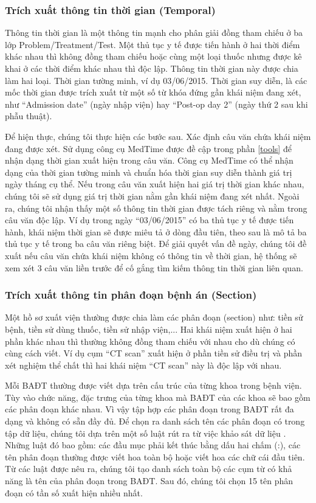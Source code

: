 \subsubsection*{Trích xuất thông tin thời gian (Temporal)}
Thông tin thời gian là một thông tin mạnh cho phân giải đồng tham chiếu ở ba lớp Problem/Treatment/Test. Một thủ tục y tế được tiến hành ở hai thời điểm khác nhau thì không đồng tham chiếu hoặc cùng một loại thuốc nhưng được kê khai ở các thời điểm khác nhau thì độc lập. Thông tin thời gian này được chia làm hai loại. Thời gian tường minh, ví dụ 03/06/2015. Thời gian suy diễn, là các mốc thời gian được trích xuất từ một số từ khóa đứng gần khái niệm đang xét, như ``Admission date'' (ngày nhập viện) hay ``Post-op day 2'' (ngày thứ 2 sau khi phẫu thuật).

Để hiện thực, chúng tôi thực hiện các bước sau. Xác định câu văn chứa khái niệm đang được xét. Sử dụng công cụ MedTime được đề cập trong phần \ref{tools} để nhận dạng thời gian xuất hiện trong câu văn. Công cụ MedTime có thể nhận dạng của thời gian tường minh và chuẩn hóa thời gian suy diễn thành giá trị ngày tháng cụ thể. Nếu trong câu văn xuất hiện hai giá trị thời gian khác nhau, chúng tôi sẽ sử dụng giá trị thời gian nằm gần khái niệm đang xét nhất. Ngoài ra, chúng tôi nhận thấy một số thông tin thời gian được tách riêng và nằm trong câu văn độc lập. Ví dụ trong ngày ``03/06/2015'' có ba thủ tục y tế được tiến hành, khái niệm thời gian sẽ được miêu tả ở dòng đầu tiên, theo sau là mô tả ba thủ tục y tế trong ba câu văn riêng biệt. Để giải quyết vấn đề ngày, chúng tôi đề xuất nếu câu văn chứa khái niệm không có thông tin về thời gian, hệ thống sẽ xem xét 3 câu văn liền trước để cố gắng tìm kiếm thông tin thời gian liên quan.

\subsubsection*{Trích xuất thông tin phân đoạn bệnh án (Section)}
Một hồ sơ xuất viện thường được chia làm các phân đoạn (section) như: tiền sử bệnh, tiền sử dùng thuốc, tiền sử nhập viện,... Hai khái niệm xuất hiện ở hai phần khác nhau thì thường không đồng tham chiếu với nhau cho dù chúng có cùng cách viết. Ví dụ cụm “CT scan” xuất hiện ở phần tiền sử điều trị và phần xét nghiệm thể chất thì hai khái niệm “CT scan” này là độc lập với nhau.

Mỗi BAĐT thường được viết dựa trên cấu trúc của từng khoa trong bệnh viện. Tùy vào chức năng, đặc trưng của từng khoa mà BAĐT của các khoa sẽ bao gồm các phân đoạn khác nhau. Vì vậy tập hợp các phân đoạn trong BAĐT rất đa dạng và không có sẵn đầy đủ. Để chọn ra danh sách tên các phân đoạn có trong tập dữ liệu, chúng tôi dựa trên một số luật rút ra từ việc khảo sát dữ liệu \cite{RandolphMiller2008}. Những luật đó bao gồm: các đầu mục phải kết thúc bằng dấu hai chấm (:), các tên phân đoạn thường được viết hoa toàn bộ hoặc viết hoa các chữ cái đầu tiên. Từ các luật được nêu ra, chúng tôi tạo danh sách toàn bộ các cụm từ có khả năng là tên của phân đoạn trong BAĐT. Sau đó, chúng tôi chọn 15 tên phân đoạn có tần số xuất hiện nhiều nhất.

